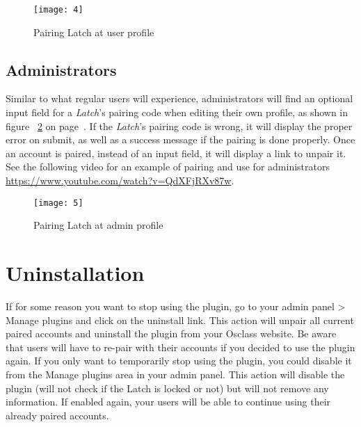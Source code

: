 \documentclass[
10pt,
a4paper,
oneside,
headinclude,footinclude,
BCOR5mm,
]{scrartcl}
\begin{document}
\begin{figure}[h!]
  \begin{center}
    \texttt{[image: 4]}
    \caption{Pairing Latch at user profile}
    \label{fig:user}
  \end{center}
\end{figure}


\subsection{Administrators}
Similar to what regular users will experience, administrators will find an optional input field for a \textit{Latch}'s pairing code when editing their own profile, as shown in figure ~\ref{fig:admin} on page~\pageref{fig:admin}. If the \textit{Latch}'s pairing code is wrong, it will display the proper error on submit, as well as a success message if the pairing is done properly. Once an account is paired, instead of an input field, it will display a link to unpair it. See the following video for an example of pairing and use for administrators \href{https://www.youtube.com/watch?v=QdXFjRXv87w}{https://www.youtube.com/watch?v=QdXFjRXv87w}.



\begin{figure}[h!]
  \begin{center}
    \texttt{[image: 5]}
    \caption{Pairing Latch at admin profile}
    \label{fig:admin}
  \end{center}
\end{figure}

\section{Uninstallation}
If for some reason you want to stop using the plugin, go to your admin panel >  Manage plugins and click on the uninstall link. This action will unpair all current paired accounts and uninstall the plugin from your Osclass website. Be aware that users will have to re-pair with their accounts if you decided to use the plugin again. If you only want to temporarily stop using the plugin, you could disable it from the Manage plugins area in your admin panel. This action will disable the plugin (will not check if the Latch is locked or not) but will not remove any information. If enabled again, your users will be able to continue using their already paired accounts.
\end{document}
